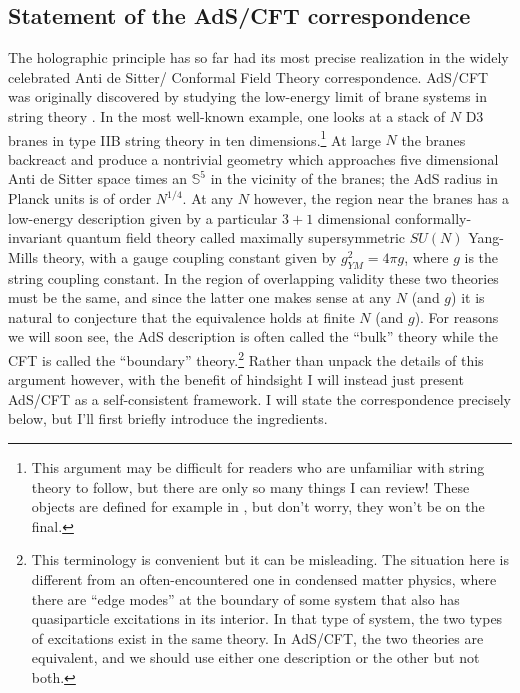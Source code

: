\documentclass[12pt]{article}
\begin{document}
\subsection{Statement of the AdS/CFT correspondence}
The holographic principle has so far had its most precise realization in the widely celebrated Anti de Sitter/ Conformal Field Theory correspondence.  AdS/CFT was originally discovered by studying the low-energy limit of brane systems in string theory \cite{Maldacena:1997re}.  In the most well-known example, one looks at a stack of $N$ D3 branes in type IIB string theory in ten dimensions.\footnote{This argument may be difficult for readers who are unfamiliar with string theory to follow, but there are only so many things I can review!  These objects are defined for example in \cite{Polchinski:1998rr}, but don't worry, they won't be on the final.}  At large $N$ the branes backreact and produce a nontrivial geometry which approaches five dimensional Anti de Sitter space times an $\mathbb{S}^5$ in the vicinity of the branes; the AdS radius in Planck units is of order $N^{1/4}$.  At any $N$ however, the region near the branes has a low-energy description given by a particular $3+1$ dimensional conformally-invariant quantum field theory called maximally supersymmetric $SU(N)$ Yang-Mills theory, with a gauge coupling constant given by $g_{YM}^2=4\pi g$, where $g$ is the string coupling constant.  In the region of overlapping validity these two theories must be the same, and since the latter one makes sense at any $N$ (and $g$) it is natural to conjecture that the equivalence holds at finite $N$ (and $g$).  For reasons we will soon see, the AdS description is often called the ``bulk'' theory while the CFT is called the ``boundary'' theory.\footnote{This terminology is convenient but it can be misleading.  The situation here is different from an often-encountered one in condensed matter physics, where there are ``edge modes'' at the boundary of some system that also has quasiparticle excitations in its interior.  In that type of system, the two types of excitations exist in the same theory.  In AdS/CFT, the two theories are equivalent, and we should use either one description or the other but not both.}  Rather than unpack the details of this argument however, with the benefit of hindsight I will instead just present AdS/CFT as a self-consistent framework.  I will state the correspondence precisely below, but I'll first briefly introduce the ingredients.  
\end{document}
